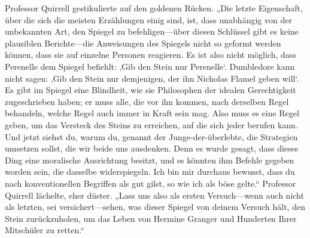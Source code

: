 Professor Quirrell gestikulierte auf den goldenen Rücken.
„Die letzte Eigenschaft, über die sich die meisten Erzählungen einig sind, ist, dass unabhängig von der unbekannten Art, den Spiegel zu befehligen—über diesen Schlüssel gibt es keine plausiblen Berichte—die Anweisungen des Spiegels nicht so geformt werden können, dass sie auf einzelne Personen reagieren. Es ist also nicht möglich, dass Perenelle dem Spiegel befiehlt: ‚Gib den Stein nur Perenelle‘. Dumbledore kann nicht sagen: ‚Gib den Stein nur demjenigen, der ihn Nicholas Flamel geben will‘. Es gibt im Spiegel eine Blindheit, wie sie Philosophen der idealen Gerechtigkeit zugeschrieben haben; er muss alle, die vor ihn kommen, nach derselben Regel behandeln, welche Regel auch immer in Kraft sein mag. Also muss es eine Regel geben, um das Versteck des Steins zu erreichen, auf die sich jeder berufen kann. Und jetzt siehst du, warum du, genannt der Junge-der-überlebte, die Strategien umsetzen sollst, die wir beide uns ausdenken. Denn es wurde gesagt, dass dieses Ding eine moralische Ausrichtung besitzt, und es könnten ihm Befehle gegeben worden sein, die dasselbe widerspiegeln. Ich bin mir durchaus bewusst, dass du nach konventionellen Begriffen als gut gilst, so wie ich als böse gelte.“ Professor Quirrell lächelte, eher düster. „Lass uns also als ersten Versuch—wenn auch nicht als letzten, sei versichert—sehen, was dieser Spiegel von deinem Versuch hält, den Stein zurückzuholen, um das Leben von Hermine Granger und Hunderten Ihrer Mitschüler zu retten.“

